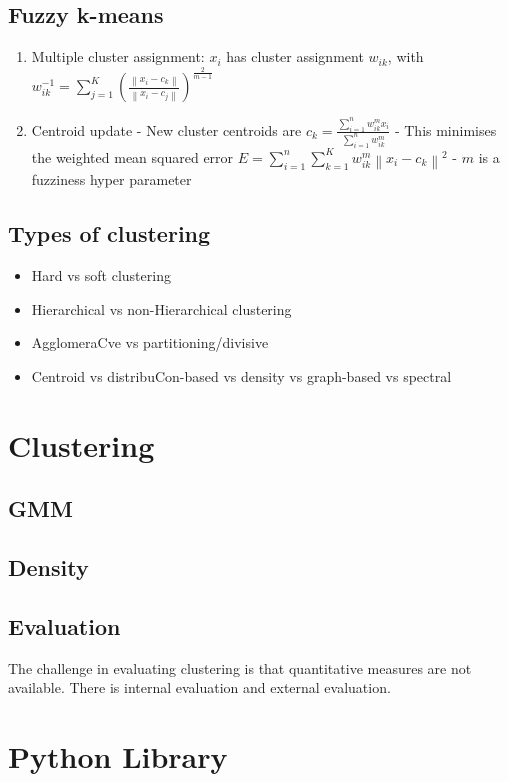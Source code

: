\documentclass[12pt,a4paper]{article}
\begin{document}
\subsection{Fuzzy k-means}
\begin{enumerate}
    \item Multiple cluster assignment: $x_i$ has cluster assignment $w_{i k}$, with $w_{i k}^{-1}=\sum_{j=1}^K\left(\frac{\left\|x_i-c_k\right\|}{\left\|x_i-c_j\right\|}\right)^{\frac{2}{m-1}}$
    \item Centroid update
- New cluster centroids are $c_k=\frac{\sum_{i=1}^n w_{i k}^m x_i}{\sum_{i=1}^n w_{i k}^m}$
- This minimises the weighted mean squared error $E=\sum_{i=1}^n \sum_{k=1}^K w_{i k}^m\left\|x_i-c_k\right\|^2$
- $m$ is a fuzziness hyper parameter
\end{enumerate}

\subsection{Types of clustering}
\begin{itemize}
    \item Hard vs soft clustering
    \item Hierarchical vs non-Hierarchical clustering
    \item AgglomeraCve vs partitioning/divisive
    \item Centroid vs distribuCon-based vs density vs graph-based vs spectral
\end{itemize}

\section{Clustering}
\subsection{GMM}
\subsection{Density}
\subsection{Evaluation}
The challenge in evaluating clustering is that quantitative measures are not available.
There is internal evaluation and external evaluation.

\section{Python Library}
\end{document}
